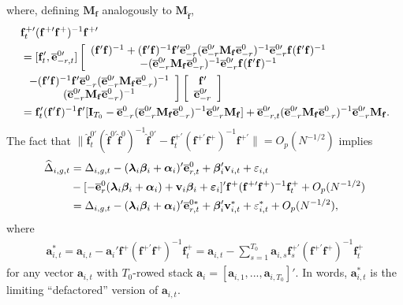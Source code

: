 \documentclass[12pt,fleqn]{article}
\def\*#1{\mathbf{#1}}
\def\+#1{\boldsymbol{#1}}
\begin{document}
where, defining $\*M_{\*f}$ analogously to $\*M_{\widehat{\*f}}$,
\begin{align}
& \*f_t^{+\prime}(\*f^{+\prime}\*f^+)^{-1}\*f^{+\prime} \notag\\
& = [\*f_t', \overline{\*e}_{-r,t}^{0\prime}]\left[\begin{array}{c} (\*f'\*f)^{-1} + (\*f'\*f)^{-1}\*f'\overline{\*e}_{-r}^0(\overline{\*e}_{-r}^{0\prime}\*M_{\*f}\overline{\*e}_{-r}^0)^{-1}\overline{\*e}_{-r}^{0\prime} \*f(\*f'\*f)^{-1}  \\
-(\overline{\*e}_{-r}^{0\prime}\*M_{\*f}\overline{\*e}_{-r}^0)^{-1}\overline{\*e}_{-r}^{0\prime}\*f (\*f'\*f)^{-1} \end{array}\right. \notag\\
& \left. \begin{array}{c}  -(\*f'\*f)^{-1}\*f'\overline{\*e}_{-r}^0(\overline{\*e}_{-r}^{0\prime}\*M_{\*f}\overline{\*e}_{-r}^0)^{-1} \\
 (\overline{\*e}_{-r}^{0\prime}\*M_{\*f}\overline{\*e}_{-r}^0)^{-1} \end{array}\right]\left[\begin{array}{c} \*f' \\
    \overline{\*e}_{-r}^{0\prime} \end{array}\right]  \notag\\
& = \*f_t'(\*f'\*f)^{-1}\*f'[\*I_{T_0} -  \overline{\*e}_{-r}^{0}(\overline{\*e}_{-r}^{0\prime}\*M_{\*f}\overline{\*e}_{-r}^0)^{-1} \overline{\*e}_{-r}^{0\prime}\*M_{\*f}] + \overline{\*e}_{-r,t}^{0\prime}(\overline{\*e}_{-r}^{0\prime}\*M_{\*f}\overline{\*e}_{-r}^0)^{-1}\overline{\*e}_{-r}^{0\prime}\*M_{\*f}.
\end{align}
The fact that $\|\widehat{\*f}_t^{0\prime}(\widehat{\*f}^{0\prime}\widehat{\*f}^0)^{-1}\widehat{\*f}^{0\prime} - \*f_t^{+\prime}(\*f^{+\prime}\*f^+)^{-1}\*f^{+\prime}\| = O_p(N^{-1/2})$ implies
\begin{align}
\widehat \Delta_{i,g,t} & = \Delta_{i,g,t} - (\+\lambda_i\+\beta_i + \+\alpha_i)'\overline{\*e}_{r,t}^0 + \+\beta_i'\*v_{i,t} + \varepsilon_{i,t} \notag\\
& - [ - \overline{\*e}_{r}^0(\+\lambda_i\+\beta_i +\+\alpha_i) + \*v_i\+\beta_i+  \+\varepsilon_{i} ]'  \*f^{+} (\*f^{+\prime}\*f^+)^{-1}\*f_t^+ + O_p(N^{-1/2})\notag\\
& = \Delta_{i,g,t} - (\+\lambda_i\+\beta_i + \+\alpha_i)'\overline{\*e}_{r,t}^{0\ast} + \+\beta_i'\*v_{i,t}^* + \varepsilon_{i,t}^*  + O_p(N^{-1/2}),
\end{align}
where
\begin{align}
\*a_{i,t}^* = \*a_{i,t} - \*a_i' \*f^{+} (\*f^{+\prime}\*f^+)^{-1}\*f_t^+ = \*a_{i,t} - \sum_{s=1}^{T_0} \*a_{i,s}\*f_s^{+\prime} (\*f^{+\prime}\*f^+)^{-1}\*f_t^+
\end{align}
for any vector $\*a_{i,t}$ with $T_0$-rowed stack $\*a_i = [\*a_{i,1},...,\*a_{i,T_0}]'$. In words, $\*a_{i,t}^*$ is the limiting ``defactored'' version of $\*a_{i,t}$.
\end{document}
